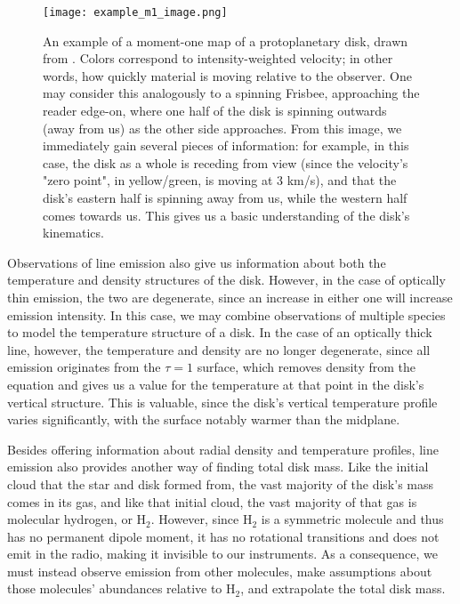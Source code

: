 \begin{figure} %
\centering
  \texttt{[image: example\_m1\_image.png]}
  \caption{An example of a moment-one map of a protoplanetary disk, drawn from \citet{Rosenfeld2012}. Colors correspond to intensity-weighted velocity; in other words, how quickly material is moving relative to the observer. One may consider this analogously to a spinning Frisbee, approaching the reader edge-on, where one half of the disk is spinning outwards (away from us) as the other side approaches. From this image, we immediately gain several pieces of information: for example, in this case, the disk as a whole is receding from view (since the velocity's "zero point", in yellow/green, is moving at 3 km/s), and that the disk's eastern half is spinning away from us, while the western half comes towards us. This gives us a basic understanding of the disk's kinematics.}
  \label{fig:ex_mom1}
\end{figure}


Observations of line emission also give us information about both the temperature and density structures of the disk. However, in the case of optically thin emission, the two are degenerate, since an increase in either one will increase emission intensity. In this case, we may combine observations of multiple species to model the temperature structure of a disk. In the case of an optically thick line, however, the temperature and density are no longer degenerate, since all emission originates from the $\tau=1$ surface, which removes density from the equation and gives us a value for the temperature at that point in the disk's vertical structure. This is valuable, since the disk's vertical temperature profile varies significantly, with the surface notably warmer than the midplane.

Besides offering information about radial density and temperature profiles, line emission also provides another way of finding total disk mass. Like the initial cloud that the star and disk formed from, the vast majority of the disk's mass comes in its gas, and like that initial cloud, the vast majority of that gas is molecular hydrogen, or H$_2$. However, since H$_2$ is a symmetric molecule and thus has no permanent dipole moment, it has no rotational transitions and does not emit in the radio, making it invisible to our instruments. As a consequence, we must instead observe emission from other molecules, make assumptions about those molecules' abundances relative to H$_2$, and extrapolate the total disk mass.


